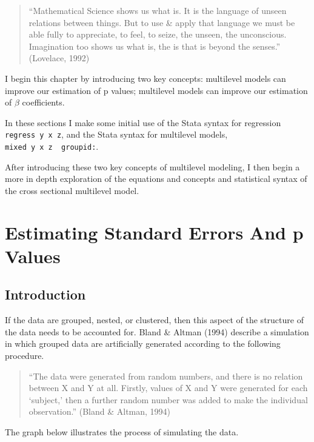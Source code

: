 \documentclass[
  letterpaper,
  DIV=11,
  numbers=noendperiod]{scrreprt}
\begin{document}
\begin{quote}
``Mathematical Science shows us what is. It is the language of unseen
relations between things. But to use \& apply that language we must be
able fully to appreciate, to feel, to seize, the unseen, the
unconscious. Imagination too shows us what is, the is that is beyond the
senses.'' (Lovelace, 1992)
\end{quote}

I begin this chapter by introducing two key concepts: multilevel models
can improve our estimation of p values; multilevel models can improve
our estimation of \(\beta\) coefficients.

In these sections I make some initial use of the Stata syntax for
regression \texttt{regress\ y\ x\ z}, and the Stata syntax for
multilevel models,
\texttt{mixed\ y\ x\ z\ \textbar{}\textbar{}\ groupid:}.

After introducing these two key concepts of multilevel modeling, I then
begin a more in depth exploration of the equations and concepts and
statistical syntax of the cross sectional multilevel model.

\hypertarget{sec-pvalues}{%
\section{Estimating Standard Errors And p Values}\label{sec-pvalues}}

\hypertarget{introduction-1}{%
\subsection{Introduction}\label{introduction-1}}

If the data are grouped, nested, or clustered, then this aspect of the
structure of the data needs to be accounted for. Bland \& Altman (1994)
describe a simulation in which grouped data are artificially generated
according to the following procedure.

\begin{quote}
``The data were generated from random numbers, and there is no relation
between X and Y at all. Firstly, values of X and Y were generated for
each `subject,' then a further random number was added to make the
individual observation.'' (Bland \& Altman, 1994)
\end{quote}

The graph below illustrates the process of simulating the data.
\end{document}
